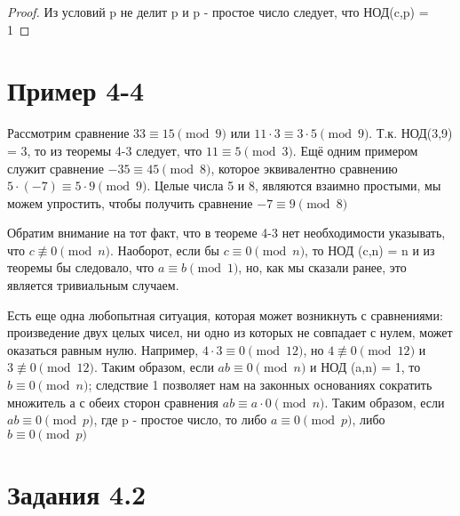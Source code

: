 \documentclass[11pt]{article}
\begin{document}
\begin{proof}
	Из условий p не делит p и p - простое число следует, что НОД(c,p) = 1
\end{proof}

\section*{Пример 4-4}

Рассмотрим сравнение $33\equiv 15 \pmod 9$ или $11\cdot3\equiv 3\cdot5 \pmod 9$. Т.к. НОД(3,9) = 3, то из теоремы 4-3 следует, что $11\equiv 5 \pmod 3$. Ещё одним примером служит сравнение $-35\equiv 45 \pmod 8$, которое эквивалентно сравнению $5\cdot(-7)\equiv 5\cdot9 \pmod 9$. Целые числа 5 и 8, являются взаимно простыми, мы можем упростить, чтобы получить сравнение $-7\equiv 9 \pmod8$


\thispagestyle{fancy}
\rhead{\thepage}

Обратим внимание на тот факт, что в теореме 4-3 нет необходимости указывать, что \newline $c \not\equiv 0 \pmod n$.
Наоборот, если бы  $c \equiv 0 \pmod n$, то НОД (c,n) = n и из теоремы бы следовало, что  $a\equiv b \pmod 1$, но, как мы сказали ранее, это является тривиальным случаем.

Есть еще одна любопытная ситуация, которая может возникнуть с сравнениями: произведение двух целых чисел, ни одно из которых не совпадает с нулем, может оказаться равным нулю. Например, $4\cdot 3\equiv0 \pmod {12}$, но $4\not\equiv0 \pmod {12}$ и $3\not\equiv0 \pmod {12}$. Таким образом, если $ab\equiv0\pmod n$ и НОД (a,n) = 1, то $b\equiv0\pmod n$; следствие 1 позволяет нам на законных основаниях сократить множитель а с обеих сторон сравнения
$ab\equiv a\cdot0\pmod n$. Таким образом, если $ab\equiv0\pmod p$, где p - простое число, то либо $a\equiv0\pmod p$, либо $b\equiv0\pmod p$

\section* {\center Задания 4.2}
\end{document}
